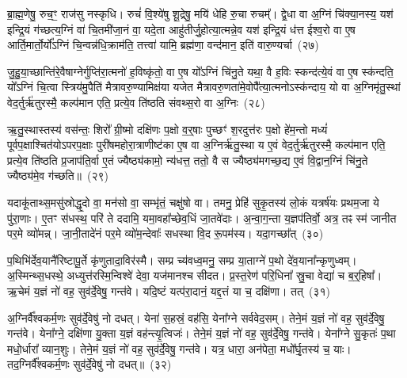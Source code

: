ब्रा॒ह्म॒णेषु॒ रुच॒ꣳ॒ राज॑सु नस्कृधि। रुचं॑ वि॒श्ये॑षु शू॒द्रेषु॒ मयि॑ धेहि रु॒चा रुचम्᳚। द्वे॒धा वा अ॒ग्निं चि॑क्या॒नस्य॒ यश॑ इन्द्रि॒यं ग॑च्छत्य॒ग्निं वा॑ चि॒तमी॑जा॒नं वा॒ यदे॒ता आहु॑तीर्जु॒होत्या॒त्मन्ने॒व यश॑ इन्द्रि॒यं ध॑त्त ईश्व॒रो वा ए॒ष आर्ति॒मार्तो॒र्यो᳚\-ऽग्निं चि॒न्वन्न॑धि॒क्राम॑ति॒ तत्त्वा॑ यामि॒ ब्रह्म॑णा॒ वन्द॑मान॒ इति॑ वारु॒ण्यर्चा~(२७)

जु॒हु॒या॒च्छान्ति॑रे॒वैषाग्नेर्गुप्ति॑रा॒त्मनो॑ ह॒विष्कृ॑तो॒ वा ए॒ष यो᳚\-ऽग्निं चि॑नु॒ते यथा॒ वै ह॒विः स्कन्द॑त्ये॒वं वा ए॒ष स्क॑न्दति॒ यो᳚\-ऽग्निं चि॒त्वा स्त्रिय॑मु॒पैति॑ मैत्रावरु॒ण्यामिक्ष॑या यजेत मैत्रावरु॒णता॑मे॒वोपै᳚त्या॒त्मनो\-ऽस्क॑न्दाय॒ यो वा अ॒ग्निमृ॑तु॒स्थां वेद॒र्तुर्\mbox{}ऋ॑तुरस्मै॒ कल्प॑मान एति॒ प्रत्ये॒व ति॑ष्ठति संवथ्स॒रो वा अ॒ग्निः~(२८)

ऋ॒तु॒स्थास्तस्य॑ वस॑न्तः॒ शिरो᳚ ग्री॒ष्मो दक्षि॑णः प॒क्षो व॒र्॒\mbox{}षाः पुच्छꣳ॑ श॒रदुत्त॑रः प॒क्षो हे॑म॒न्तो मध्यं॑ पूर्वप॒क्षाश्चित॑यो\-ऽपरप॒क्षाः पुरी॑षमहोरा॒त्राणीष्ट॑का ए॒ष वा अ॒ग्निर्\mbox{}ऋ॑तु॒स्था य ए॒वं वेद॒र्तुर्\mbox{}ऋ॑तुरस्मै॒ कल्प॑मान एति॒ प्रत्ये॒व ति॑ष्ठति प्र॒जा\-प॑ति॒र्वा ए॒तं ज्यैष्ठ्य॑कामो॒ न्य॑धत्त॒ ततो॒ वै स ज्यैष्ठ्य॑मगच्छ॒द्य ए॒वं वि॒द्वान॒ग्निं चि॑नु॒ते ज्यैष्ठ्य॑मे॒व ग॑च्छति॥~(२९)

{\anuvakamend[{पृ॒थि॒वीं य॑च्छ॒ यथ्स्व॑यमातृ॒ण्णा उ॑प॒धाय॑ धेह्यृ॒चाग्निश्चि॑नु॒ते त्रीणि॑ च}]}%

यदाकू॑ताथ्स॒मसु॑स्रोद्धृ॒दो वा॒ मन॑सो वा॒ सम्भृ॑तं॒ चक्षु॑षो वा। तमनु॒ प्रेहि॑ सुकृ॒तस्य॑ लो॒कं यत्रर्\mbox{}ष॑यः प्रथम॒जा ये पु॑रा॒णाः। ए॒तꣳ स॑धस्थ॒ परि॑ ते ददामि॒ यमा॒वहा᳚च्छेव॒धिं जा॒तवे॑दाः। अ॒न्वा॒ग॒न्ता य॒ज्ञप॑तिर्वो॒ अत्र॒ तꣴ स्म॑ जानीत पर॒मे व्यो॑मन्न्। जा॒नी॒तादे॑नं पर॒मे व्यो॑म॒न्देवाः᳚ सधस्था वि॒द रू॒पम॑स्य। यदा॒गच्छा᳚त्~(३०)

प॒थिभि॑र्देव॒यानै॑रिष्टापू॒र्ते कृ॑णुतादा॒विर॑स्मै। सम्प्र च्य॑वध्व॒मनु॒ सम्प्र या॒ताग्ने॑ प॒थो दे॑व॒याना᳚न्कृणुध्वम्। अ॒स्मिन्थ्स॒धस्थे॒ अध्युत्त॑रस्मि॒न्विश्वे॑ देवा॒ यज॑मानश्च सीदत। प्र॒स्त॒रेण॑ परि॒धिना᳚ स्रु॒चा वेद्या॑ च ब॒र्॒\mbox{}हिषा᳚। ऋ॒चेमं य॒ज्ञं नो॑ वह॒ सुव॑र्दे॒वेषु॒ गन्त॑वे। यदि॒ष्टं यत्प॑रा॒दानं॒ यद्द॒त्तं या च॒ दक्षि॑णा। तत्~(३१)

अ॒ग्निर्वै᳚श्वकर्म॒णः सुव॑र्दे॒वेषु॑ नो दधत्। येना॑ स॒हस्रं॒ वह॑सि॒ येना᳚ग्ने सर्ववेद॒सम्। तेने॒मं य॒ज्ञं नो॑ वह॒ सुव॑र्दे॒वेषु॒ गन्त॑वे। येना᳚ग्ने॒ दक्षि॑णा यु॒क्ता य॒ज्ञं वह॑न्त्यृ॒त्विजः॑। तेने॒मं य॒ज्ञं नो॑ वह॒ सुव॑र्दे॒वेषु॒ गन्त॑वे। येना᳚ग्ने सु॒कृतः॑ प॒था मधो॒र्धारा᳚ व्यान॒शुः। तेने॒मं य॒ज्ञं नो॑ वह॒ सुव॑र्दे॒वेषु॒ गन्त॑वे। यत्र॒ धारा॒ अन॑पेता॒ मधो᳚र्घृ॒तस्य॑ च॒ याः। तद॒ग्निर्वै᳚श्वकर्म॒णः सुव॑र्दे॒वेषु॑ नो दधत्॥~(३२)

